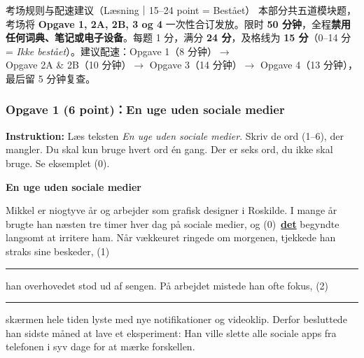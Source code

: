 

\begin{tipbox}{考场规则与配速建议（Læsning｜15--24 point = Bestået）}
\small
本部分共五道模块题，考场将 \textbf{Opgave 1, 2A, 2B, 3 og 4} 一次性合订发放。限时 \textbf{50 分钟}，全程\textbf{禁用任何词典、笔记或电子设备}。每题 1 分，满分 \textbf{24 分}，及格线为 \textbf{15 分}（0--14 分 = \textit{Ikke bestået}）。建议配速：Opgave 1（8 分钟）$\rightarrow$ Opgave 2A \& 2B（10 分钟）$\rightarrow$ Opgave 3（14 分钟）$\rightarrow$ Opgave 4（13 分钟），最后留 5 分钟复查。
\end{tipbox}

\subsubsection*{Opgave 1 (6 point)：En uge uden sociale medier}

\textbf{Instruktion:} Læs teksten \textit{En uge uden sociale medier}. Skriv de ord (1--6), der mangler. Du skal kun bruge hvert ord én gang. Der er seks ord, du ikke skal bruge. Se eksemplet (0).

\vspace{0.35em}
\textbf{\color{NCDNavy}En uge uden sociale medier}

\vspace{0.2em}
Mikkel er niogtyve år og arbejder som grafisk designer i Roskilde. I mange år brugte han næsten tre timer hver dag på sociale medier, og (0)\ \underline{\textbf{det}} begyndte langsomt at irritere ham. Når vækkeuret ringede om morgenen, tjekkede han straks sine beskeder, (1)\ \rule{2.0cm}{0.4pt} han overhovedet stod ud af sengen. På arbejdet mistede han ofte fokus, (2)\ \rule{2.0cm}{0.4pt} skærmen hele tiden lyste med nye notifikationer og videoklip. Derfor besluttede han sidste måned at lave et eksperiment: Han ville slette alle sociale apps fra telefonen i syv dage for at mærke forskellen.

